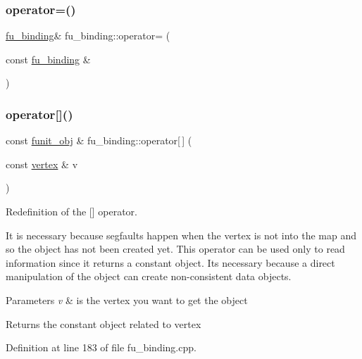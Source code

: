 \subsubsection{\texorpdfstring{operator=()}{operator=()}}
{\footnotesize\ttfamily \hyperlink{classfu__binding}{fu\+\_\+binding}\& fu\+\_\+binding\+::operator= (\begin{DoxyParamCaption}\item[{const \hyperlink{classfu__binding}{fu\+\_\+binding} \&}]{ }\end{DoxyParamCaption})\hspace{0.3cm}{\ttfamily [delete]}}

\mbox{\label{classfu__binding_a51f3555cae82ec4eabe7c2ad3d21475a}} 
\subsubsection{\texorpdfstring{operator[]()}{operator[]()}}
{\footnotesize\ttfamily const \hyperlink{classfunit__obj}{funit\+\_\+obj} \& fu\+\_\+binding\+::operator\mbox{[}$\,$\mbox{]} (\begin{DoxyParamCaption}\item[{const \hyperlink{graph_8hpp_abefdcf0544e601805af44eca032cca14}{vertex} \&}]{v }\end{DoxyParamCaption})}



Redefinition of the \mbox{[}\mbox{]} operator. 

It is necessary because segfaults happen when the vertex is not into the map and so the object has not been created yet. This operator can be used only to read information since it returns a constant object. It\textquotesingle{}s necessary because a direct manipulation of the object can create non-\/consistent data objects. 
\begin{DoxyParams}{Parameters}
{\em v} & is the vertex you want to get the object \\
\hline
\end{DoxyParams}
\begin{DoxyReturn}{Returns}
the constant object related to vertex 
\end{DoxyReturn}


Definition at line 183 of file fu\+\_\+binding.\+cpp.



